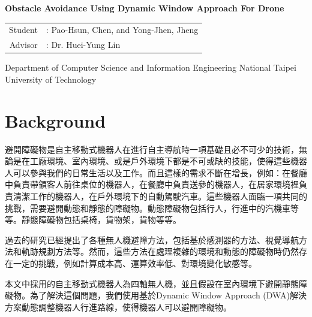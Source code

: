 \documentclass[12pt, a4paper, oneside]{article}
\newcommand{\englishTitle}{Obstacle Avoidance Using Dynamic Window Approach For Drone}
\newcommand{\studentEnName}{Pao-Hsun, Chen, and Yong-Jhen, Jheng}
\newcommand{\advisorEnName}{Huei-Yung Lin}
\begin{document}
	
	\begin{titlepage}
		\begin{center}
			\LARGE
			\begin{singlespace}
				\textbf{\englishTitle{}} \\[0.5cm]
			\end{singlespace}
			
			\begin{singlespace}
				\begin{tabular}{r l}
					Student     & : \studentEnName{}  \\
					Advisor  & : Dr. \advisorEnName{} \\[0.5cm]
				\end{tabular}
			\end{singlespace}
			
			\begin{singlespace}
				Department of Computer Science
				and Information Engineering
				National Taipei University of Technology\\[0.5cm]
			\end{singlespace}
			
		\end{center}
	\end{titlepage}
	
	\section{Background}
     避開障礙物是自主移動式機器人在進行自主導航時一項基礎且必不可少的技術，無論是在工廠環境、室內環境、或是戶外環境下都是不可或缺的技能，使得這些機器人可以參與我們的日常生活以及工作。而且這樣的需求不斷在增長，例如：在餐廳中負責帶領客人前往桌位的機器人，在餐廳中負責送參的機器人，在居家環境裡負責清潔工作的機器人，在戶外環境下的自動駕駛汽車。這些機器人面臨一項共同的挑戰，需要避開動態和靜態的障礙物。動態障礙物包括行人，行進中的汽機車等等。靜態障礙物包括桌椅，貨物架，貨物等等。
     
     過去的研究已經提出了各種無人機避障方法，包括基於感測器的方法、視覺導航方法和軌跡規劃方法等。然而，這些方法在處理複雜的環境和動態的障礙物時仍然存在一定的挑戰，例如計算成本高、運算效率低、對環境變化敏感等。

     本文中採用的自主移動式機器人為四軸無人機，並且假設在室內環境下避開靜態障礙物。為了解決這個問題，我們使用基於Dynamic Window Approach (DWA)解決方案動態調整機器人行進路線，使得機器人可以避開障礙物。
     
\end{document}
